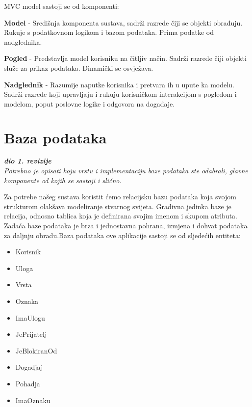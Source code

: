 	\indent MVC model sastoji se od komponenti:
	\begin{packed_item}
		\item 	\textbf{Model} - Središnja komponenta sustava, sadrži razrede čiji se objekti obrađuju. Rukuje s podatkovnom logikom i bazom podataka. Prima podatke od nadglednika.
		\item 	\textbf{Pogled} - Predstavlja model korisniku na čitljiv način. Sadrži razrede čiji objekti služe za prikaz podataka. Dinamički se osvježava.
		\item	\textbf{Nadglednik} - Razumije naputke korisnika i pretvara ih u upute ka modelu. Sadrži razrede koji upravljaju i rukuju korisničkom interakcijom s pogledom i modelom, poput poslovne logike i odgovora na događaje.
	\end{packed_item}

	\eject
		

		

				
		\section{Baza podataka}
			
			\textbf{\textit{dio 1. revizije}}\\
			
		\textit{Potrebno je opisati koju vrstu i implementaciju baze podataka ste odabrali, glavne komponente od kojih se sastoji i slično.}
		
		Za potrebe našeg sustava koristit ćemo relacijsku bazu podataka koja svojom strukturom olakšava modeliranje stvarnog svijeta. Gradivna jedinka baze je relacija, odnosno tablica koja je definirana svojim imenom i skupom atributa. Zadaća baze podataka je brza i jednostavna pohrana, izmjena i dohvat podataka za daljnju obradu.Baza podataka ove aplikacije sastoji se od sljedećih entiteta:
		
		\begin{itemize}
			\item Korisnik
			\item Uloga
			\item Vrsta
			\item Oznaka
			\item ImaUlogu
			\item JePrijatelj
			\item JeBlokiranOd
			\item Dogadjaj
			\item Pohadja
			\item ImaOznaku
			
		\end{itemize}
		
